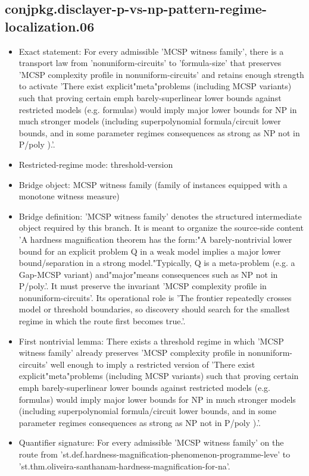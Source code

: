 \documentclass[11pt]{article}
\begin{document}
\subsection*{conjpkg.disclayer-p-vs-np-pattern-regime-localization.06}
\begin{itemize}
\item Exact statement: For every admissible 'MCSP witness family', there is a transport law from 'nonuniform-circuits' to 'formula-size' that preserves 'MCSP complexity profile in nonuniform-circuits' and retains enough strength to activate 'There exist explicit"meta"problems (including MCSP variants) such that proving certain emph barely-superlinear lower bounds against restricted models (e.g. formulas) would imply major lower bounds for NP in much stronger models (including superpolynomial formula/circuit lower bounds, and in some parameter regimes consequences as strong as NP not in P/poly ).'.
\item Restricted-regime mode: threshold-version
\item Bridge object: MCSP witness family (family of instances equipped with a monotone witness measure)
\item Bridge definition: 'MCSP witness family' denotes the structured intermediate object required by this branch. It is meant to organize the source-side content 'A hardness magnification theorem has the form:"A barely-nontrivial lower bound for an explicit problem Q in a weak model implies a major lower bound/separation in a strong model."Typically, Q is a meta-problem (e.g. a Gap-MCSP variant) and"major"means consequences such as NP not in P/poly.'. It must preserve the invariant 'MCSP complexity profile in nonuniform-circuits'. Its operational role is 'The frontier repeatedly crosses model or threshold boundaries, so discovery should search for the smallest regime in which the route first becomes true.'.
\item First nontrivial lemma: There exists a threshold regime in which 'MCSP witness family' already preserves 'MCSP complexity profile in nonuniform-circuits' well enough to imply a restricted version of 'There exist explicit"meta"problems (including MCSP variants) such that proving certain emph barely-superlinear lower bounds against restricted models (e.g. formulas) would imply major lower bounds for NP in much stronger models (including superpolynomial formula/circuit lower bounds, and in some parameter regimes consequences as strong as NP not in P/poly ).'.
\item Quantifier signature: For every admissible 'MCSP witness family' on the route from 'st.def.hardness-magnification-phenomenon-programme-leve' to 'st.thm.oliveira-santhanam-hardness-magnification-for-na'.

\end{itemize}
\end{document}
